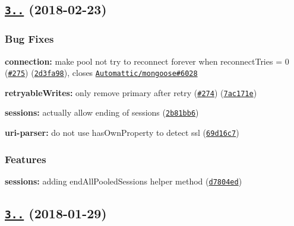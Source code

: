 \label{_3.0.3}%
 \subsection*{\href{https://github.com/mongodb-js/mongodb-core/compare/v3.0.2...v3.0.3}{\tt 3..} (2018-\/02-\/23)}

\subsubsection*{Bug Fixes}


\begin{DoxyItemize}
\item {\bfseries connection\+:} make pool not try to reconnect forever when reconnect\+Tries = 0 (\href{https://github.com/mongodb-js/mongodb-core/issues/275}{\tt \#275}) (\href{https://github.com/mongodb-js/mongodb-core/commit/2d3fa98}{\tt 2d3fa98}), closes \href{https://github.com/Automattic/mongoose/issues/6028}{\tt Automattic/mongoose\#6028}
\item {\bfseries retryable\+Writes\+:} only remove primary after retry (\href{https://github.com/mongodb-js/mongodb-core/issues/274}{\tt \#274}) (\href{https://github.com/mongodb-js/mongodb-core/commit/7ac171e}{\tt 7ac171e})
\item {\bfseries sessions\+:} actually allow ending of sessions (\href{https://github.com/mongodb-js/mongodb-core/commit/2b81bb6}{\tt 2b81bb6})
\item {\bfseries uri-\/parser\+:} do not use {\ttfamily has\+Own\+Property} to detect ssl (\href{https://github.com/mongodb-js/mongodb-core/commit/69d16c7}{\tt 69d16c7})
\end{DoxyItemize}

\subsubsection*{Features}


\begin{DoxyItemize}
\item {\bfseries sessions\+:} adding end\+All\+Pooled\+Sessions helper method (\href{https://github.com/mongodb-js/mongodb-core/commit/d7804ed}{\tt d7804ed})
\end{DoxyItemize}

\label{_3.0.2}%
 \subsection*{\href{https://github.com/mongodb-js/mongodb-core/compare/v3.0.1...v3.0.2}{\tt 3..} (2018-\/01-\/29)}

